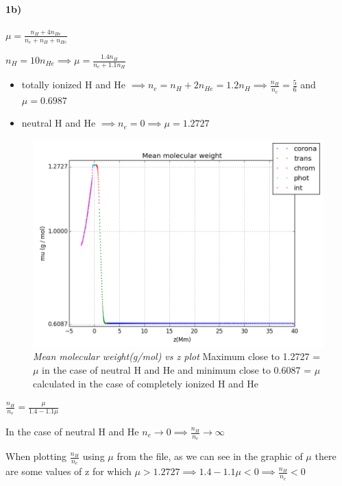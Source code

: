 \documentclass[10pt]{book}
\begin{document}
\paragraph {1b)}

$\mu = \frac{n_{H} + 4 n_{He}}{n_e + n_H + n_{He}} $

$n_H= 10 n_{He} \implies  \mu = \frac{1.4 n_H}{n_e + 1.1 n_H}$


\begin{itemize}
\item totally ionized H and He $\implies n_e = n_H + 2 n_{He} = 1.2 n_H \implies \frac{n_H}{n_e} = \frac{5}{6} $ and 
$ \mu = 0.6987 $
\item neutral H and He $\implies n_e = 0 \implies  \mu = 1.2727 $

\end{itemize}



\begin{figure}[!ht]
 \centering
 \includegraphics[scale=0.5]{mmmLayers.png}
 \caption{\emph{Mean molecular weight(g/mol) vs z plot} Maximum close to 1.2727 = $\mu$ in the case of neutral H and He and minimum close to 0.6087 = $\mu$ calculated in the case of completely ionized H and He }
\end{figure}

$\frac{n_H}{n_e} =  \frac{\mu}{1.4 - 1.1 \mu }   $

In the case of neutral H and He $n_e \rightarrow 0 \implies \frac{n_H}{n_e} \rightarrow \infty $

When plotting  $\frac{n_H}{n_e}$ using $\mu$ from the file, as we can see in the graphic of $\mu$ there are some values of z for which
$\mu > 1.2727 \implies 1.4 - 1.1 \mu < 0 \implies \frac{n_H}{n_e} < 0$
\end{document}

